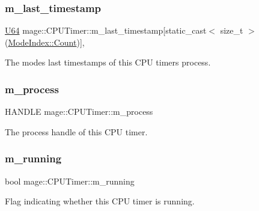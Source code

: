 \subsubsection{\texorpdfstring{m\+\_\+last\+\_\+timestamp}{m\_last\_timestamp}}
{\footnotesize\ttfamily \hyperlink{namespacemage_a6672cf3c861707ce4a3235a3eb43941d}{U64} mage\+::\+C\+P\+U\+Timer\+::m\+\_\+last\+\_\+timestamp\mbox{[}static\+\_\+cast$<$ size\+\_\+t $>$(\hyperlink{classmage_1_1_c_p_u_timer_a220f69be8f304f6fad61ccb358d278faae93f994f01c537c4e2f7d8528c3eb5e9}{Mode\+Index\+::\+Count})\mbox{]}\hspace{0.3cm}{\ttfamily [mutable]}, {\ttfamily [private]}}

The modes\textquotesingle{} last timestamps of this C\+PU timer\textquotesingle{}s process. \hypertarget{classmage_1_1_c_p_u_timer_ac99b24abe1fe0753b18cfa39b298a876}{}\label{classmage_1_1_c_p_u_timer_ac99b24abe1fe0753b18cfa39b298a876} 
\subsubsection{\texorpdfstring{m\+\_\+process}{m\_process}}
{\footnotesize\ttfamily H\+A\+N\+D\+LE mage\+::\+C\+P\+U\+Timer\+::m\+\_\+process\hspace{0.3cm}{\ttfamily [private]}}

The process handle of this C\+PU timer. \hypertarget{classmage_1_1_c_p_u_timer_a7190afa453085b7bbd7cb76ff6bb62f2}{}\label{classmage_1_1_c_p_u_timer_a7190afa453085b7bbd7cb76ff6bb62f2} 
\subsubsection{\texorpdfstring{m\+\_\+running}{m\_running}}
{\footnotesize\ttfamily bool mage\+::\+C\+P\+U\+Timer\+::m\+\_\+running\hspace{0.3cm}{\ttfamily [private]}}

Flag indicating whether this C\+PU timer is running. \hypertarget{classmage_1_1_c_p_u_timer_a1c6d043eb08b1689d0f52dbd886fa9d4}{}\label{classmage_1_1_c_p_u_timer_a1c6d043eb08b1689d0f52dbd886fa9d4} 
